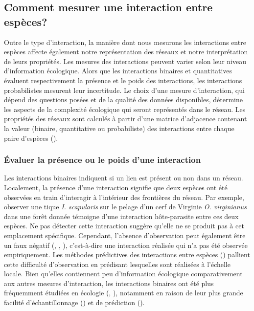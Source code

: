 \subsection{Comment mesurer une interaction entre espèces?} 

Outre le type d'interaction, la manière dont nous mesurons les interactions
entre espèces affecte également notre représentation des réseaux et notre
interprétation de leurs propriétés. Les mesures des interactions peuvent varier
selon leur niveau d'information écologique. Alors que les interactions binaires
et quantitatives évaluent respectivement la présence et le poids des
interactions, les interactions probabilistes mesurent leur incertitude. Le choix
d'une mesure d'interaction, qui dépend des questions posées et de la qualité des
données disponibles, détermine les aspects de la complexité écologique qui
seront représentés dans le réseau. Les propriétés des réseaux sont calculés à
partir d'une matrice d'adjacence contenant la valeur (binaire, quantitative ou
probabiliste) des interactions entre chaque paire d'espèces
(\cite{Delmas2019Analysing}).

\subsubsection{Évaluer la présence ou le poids d'une interaction} 

Les interactions binaires indiquent si un lien est présent ou non dans un
réseau. Localement, la présence d'une interaction signifie que deux espèces ont
été observées en train d'interagir à l'intérieur des frontières du réseau. Par
exemple, observer une tique \textit{I. scapularis} sur le pelage d'un cerf de
Virginie \textit{O. virginianus} dans une forêt donnée témoigne d'une
interaction hôte-parasite entre ces deux espèces. Ne pas détecter cette
interaction suggère qu'elle ne se produit pas à cet emplacement spécifique.
Cependant, l'absence d'observation peut également être un faux négatif
(\cite{Bluthgen2010Why}, \cite{Chacoff2012Evaluating}, \cite{Stock2017Linear}),
c'est-à-dire une interaction réalisée qui n'a pas été observée empiriquement.
Les méthodes prédictives des interactions entre espèces
(\cite{Strydom2021Roadmapa}) pallient cette difficulté d'observation en
prédisant lesquelles sont réalisées à l'échelle locale. Bien qu'elles
contiennent peu d'information écologique comparativement aux autres mesures
d'interaction, les interactions binaires ont été plus fréquemment étudiées en
écologie (\cite{Pascual2006Ecological}, \cite{Delmas2019Analysing}), notamment
en raison de leur plus grande facilité d'échantillonnage
(\cite{Jordano2016Sampling}) et de prédiction (\cite{Strydom2021Roadmapa}).

